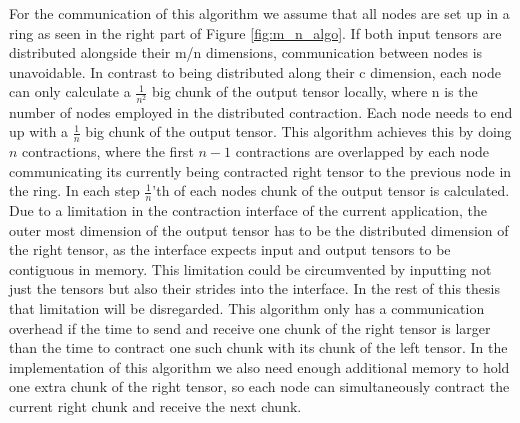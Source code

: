 For the communication of this algorithm we assume that all nodes are set up in a ring as seen in the right part of Figure \ref{fig:m_n_algo}.
If both input tensors are distributed alongside their m/n dimensions, communication between nodes is unavoidable.
In contrast to being distributed along their c dimension, each node can only calculate a $\frac{1}{n^2}$ big chunk of the output tensor locally, where n is the number of nodes employed in the distributed contraction.
Each node needs to end up with a $\frac{1}{n}$ big chunk of the output tensor.
This algorithm achieves this by doing $n$ contractions, where the first $n-1$ contractions are overlapped by each node communicating its currently being contracted right tensor to the previous node in the ring.
In each step $\frac{1}{n}$'th of each nodes chunk of the output tensor is calculated.
Due to a limitation in the contraction interface of the current application, the outer most dimension of the output tensor has to be the distributed dimension of the right tensor, as the interface expects input and output tensors to be contiguous in memory.
This limitation could be circumvented by inputting not just the tensors but also their strides into the interface.
In the rest of this thesis that limitation will be disregarded.
This algorithm only has a communication overhead if the time to send and receive one chunk of the right tensor is larger than the time to contract one such chunk with its chunk of the left tensor.
In the implementation of this algorithm we also need enough additional memory to hold one extra chunk of the right tensor, so each node can simultaneously contract the current right chunk and receive the next chunk.